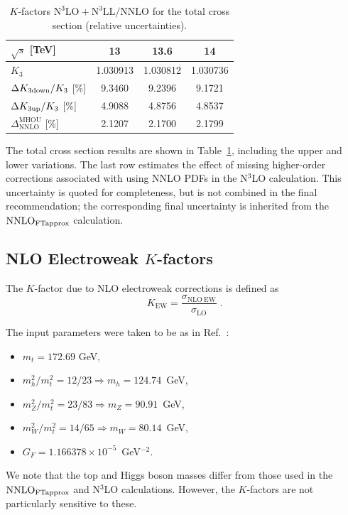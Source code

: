 \begin{table}[htbp]
\begin{center}
\begin{tabular}{lccc}
\toprule
$\sqrt{s}$ [TeV] & \textbf{13} & \textbf{13.6} & \textbf{14} \\
\midrule
$K_3$ & 1.030913 & 1.030812 & 1.030736 \\
$\Delta K_{3\rm down}/K_3$ [\%] & 9.3460 & 9.2396 & 9.1721 \\
$\Delta K_{3\rm up}/K_3$ [\%] & 4.9088 & 4.8756 & 4.8537 \\
$\Delta^{\mathrm{MHOU}}_{\mathrm{NNLO}}$ [\%] & 2.1207 & 2.1700 & 2.1799 \\
\bottomrule
\end{tabular}
\caption{$K$-factors $\mathrm{N^3LO{+}N^3LL}/\mathrm{NNLO}$ for the total cross section (relative uncertainties).}
\label{tab:kfactor_n3lo_n3ll_over_nnlo}
\end{center}
\end{table}

The total cross section results are shown in Table~\ref{tab:kfactor_n3lo_n3ll_over_nnlo}, including the upper and lower variations. The last row estimates the effect of missing higher-order corrections associated with using NNLO PDFs in the N$^3$LO calculation. This uncertainty is quoted for completeness, but is not combined in the final recommendation; the corresponding final uncertainty is inherited from the $\textup{NNLO}_{\textup{FTapprox}}$ calculation.


\subsection[\texorpdfstring{NLO Electroweak $K$-factors}{NLO Electroweak K-factors}]{\texorpdfstring{NLO Electroweak \boldmath$K$-factors}{NLO Electroweak K-factors}}

The $K$-factor due to NLO electroweak corrections is defined as
\begin{equation}\label{eq:NLOEWkfac}
K_\mathrm{EW} = \frac{\sigma_\mathrm{NLO~EW}}{\sigma_\mathrm{LO}} \;. 
\end{equation}

The input parameters were taken to be as in Ref.~\cite{Bi:2023bnq}:
\begin{itemize}
\item $m_t = 172.69$ GeV,
\item $m_h^2 / m_t^2 = 12 / 23 \Rightarrow m_h = 124.74$~GeV,
\item $m_Z^2 / m_t^2 = 23 / 83 \Rightarrow m_Z = 90.91$~GeV,
\item $m_W^2 / m_t^2 = 14 / 65 \Rightarrow m_W = 80.14$~GeV,
\item $G_F = 1.166378 \times 10^{-5}$~GeV$^{-2}$.
\end{itemize}
We note that the top and Higgs boson masses differ from those used in the $\textup{NNLO}_{\textup{FTapprox}}$ and N$^3$LO calculations. However, the $K$-factors are not particularly sensitive to these.

